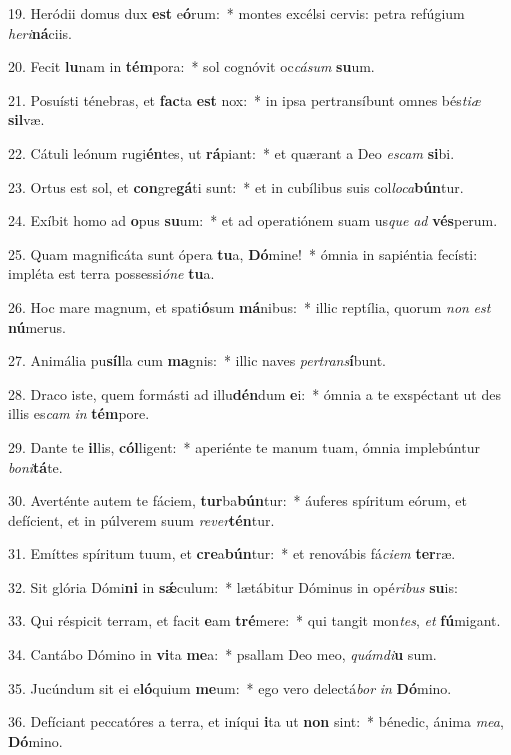 19. Heródii domus dux \textbf{est} e\textbf{ó}rum:~*  montes excélsi cervis: petra refúgium \textit{he}\textit{ri}\textbf{ná}ciis.\

20. Fecit \textbf{lu}nam in \textbf{tém}pora:~*  sol cognóvit oc\textit{cá}\textit{sum} \textbf{su}um.\

21. Posuísti ténebras, et \textbf{fac}ta \textbf{est} nox:~*  in ipsa pertransíbunt omnes bés\textit{ti}\textit{æ} \textbf{sil}væ.\

22. Cátuli leónum rugi\textbf{én}tes, ut \textbf{rá}piant:~*  et quærant a Deo \textit{es}\textit{cam} \textbf{si}bi.\

23. Ortus est sol, et \textbf{con}gre\textbf{gá}ti sunt:~*  et in cubílibus suis col\textit{lo}\textit{ca}\textbf{bún}tur.\

24. Exíbit homo ad \textbf{o}pus \textbf{su}um:~*  et ad operatiónem suam us\textit{que} \textit{ad} \textbf{vés}perum.\

25. Quam magnificáta sunt ópera \textbf{tu}a, \textbf{Dó}mine!~*  ómnia in sapiéntia fecísti: impléta est terra possessi\textit{ó}\textit{ne} \textbf{tu}a.\

26. Hoc mare magnum, et spati\textbf{ó}sum \textbf{má}nibus:~*  illic reptília, quorum \textit{non} \textit{est} \textbf{nú}merus.\

27. Animália pu\textbf{síl}la cum \textbf{ma}gnis:~*  illic naves \textit{per}\textit{trans}\textbf{í}bunt.\

28. Draco iste, quem formásti ad illu\textbf{dén}dum \textbf{e}i:~*  ómnia a te exspéctant ut des illis es\textit{cam} \textit{in} \textbf{tém}pore.\

29. Dante te \textbf{il}lis, \textbf{cól}ligent:~*  aperiénte te manum tuam, ómnia implebúntur \textit{bo}\textit{ni}\textbf{tá}te.\

30. Averténte autem te fáciem, \textbf{tur}ba\textbf{bún}tur:~*  áuferes spíritum eórum, et defícient, et in púlverem suum \textit{re}\textit{ver}\textbf{tén}tur.\

31. Emíttes spíritum tuum, et \textbf{cre}a\textbf{bún}tur:~*  et renovábis fá\textit{ci}\textit{em} \textbf{ter}ræ.\

32. Sit glória Dómi\textbf{ni} in \textbf{sǽ}culum:~*  lætábitur Dóminus in opé\textit{ri}\textit{bus} \textbf{su}is:\

33. Qui réspicit terram, et facit \textbf{e}am \textbf{tré}mere:~*  qui tangit mon\textit{tes}, \textit{et} \textbf{fú}migant.\

34. Cantábo Dómino in \textbf{vi}ta \textbf{me}a:~*  psallam Deo meo, \textit{quám}\textit{di}\textbf{u} sum.\

35. Jucúndum sit ei e\textbf{ló}quium \textbf{me}um:~*  ego vero delectá\textit{bor} \textit{in} \textbf{Dó}mino.\

36. Defíciant peccatóres a terra, et iníqui \textbf{i}ta ut \textbf{non} sint:~*  bénedic, ánima \textit{me}\textit{a}, \textbf{Dó}mino.\

